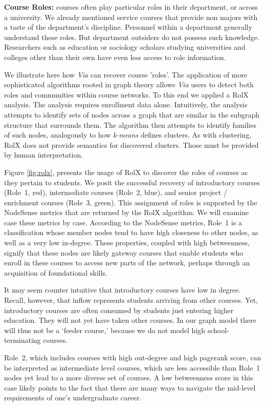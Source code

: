 \documentclass{sigchi}
\begin{document}
{\bf Course Roles:} courses often play particular roles in their
department, or across a university. We already mentioned service
courses that provide non majors with a taste of the department's
discipline. Personnel within a department generally understand these
roles. But department outsiders do not possess such
knowledge. Researchers such as education or sociology scholars
studying universities and colleges other than their own have even less
access to role information.

We illustrate here how {\em Via} can recover course 'roles'. The
application of more sophisticated algorithms rooted in graph theory
allows {\em Via} users to detect both roles and communities within
course networks. To this end we applied a RolX \cite{Henderson2012}
analysis. The analysis requires enrollment data alone. Intuitively,
the analysis attempts to identify sets of nodes across a graph that
are similar in the subgraph structure that surrounds them. The
algorithm then attempts to identify families of such nodes,
analogously to how {\em k-means} defines clusters. As with clustering,
RolX does not provide semantics for discovered clusters. Those must be
provided by human interpretation.

Figure \ref{fig:rolx}, presents the usage of RolX to discover the
roles of courses as they pertain to students. We posit the successful
recovery of introductory courses (Role~1, red), intermediate courses
(Role~2, blue), and senior project / enrichment courses (Role~3,
green). This assignment of roles is supported by the NodeSense metrics
that are returned by the RolX algorithm. We will examine case these
metrics by case. According to the NodeSense metrics, Role~1 is a
classification whose member nodes tend to have high closeness to other
nodes, as well as a very low in-degree. These properties, coupled with
high betweenness, signify that these nodes are likely gateway courses
that enable students who enroll in these courses to access new parts
of the network, perhaps through an acquisition of foundational
skills.

It may seem counter intuitive that introductory courses have low in
degree. Recall, however, that inflow represents students arriving from
other courses. Yet, introductory courses are often consumed by
students just entering higher education. They will not yet have taken
other courses. In our graph model there will thus not be a `feeder
course,' because we do not model high school-terminating courses.

Role~2, which includes courses with high out-degree and high pagerank score, can be interpreted as intermediate level courses, which are less accessible than Role~1 nodes yet lead to a more diverse set of courses. A low betweenness score in this case likely points to the fact that there are many ways to navigate the mid-level requirements of one's undergraduate career. 
\end{document}
